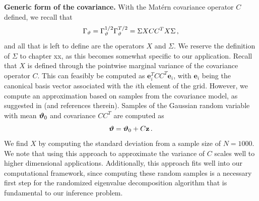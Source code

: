 \noindent\textbf{Generic form of the covariance.}
With the Mat\'ern covariance operator $C$ defined, we recall that
\begin{equation*}
    \Gamma_{\vartheta} = \Gamma_{\vartheta}^{1/2}\Gamma_{\vartheta}^{T/2}
    = \Sigma X C C^T X \Sigma \, ,
\end{equation*}
and all that is left to define are the operators $X$ and $\Sigma$.
We reserve the definition of $\Sigma$ to
chapter xx, as this becomes somewhat specific to our
application.
Recall that $X$ is defined through the pointwise marginal variance of the
covariance operator $C$.
This can feasibly be computed as $\mathbf{e}_i^TCC^T\mathbf{e}_i$, with
$\mathbf{e}_i$ being the canonical basis vector associated with the $i$th
element of the grid.
However, we compute an approximation based on samples from the covariance model, as
suggested in \citet{weaver_correlation_2001} (and references therein).
Samples of the Gaussian random variable with mean $\bm{\vartheta}_0$ and covariance
$C C^T$ are computed as
\begin{equation*}
    \bm{\vartheta} = \bm{\vartheta}_0 + C\mathbf{z} \, .
\end{equation*}
We find $X$ by computing the standard deviation from a sample size of $N=1000$.
We note that using this approach to approximate the variance of $C$ scales well
to higher dimensional applications.
Additionally, this approach fits well into our computational framework, since
computing these random samples is a necessary first step for the randomized
eigenvalue decomposition algorithm that is fundamental to our inference problem.

